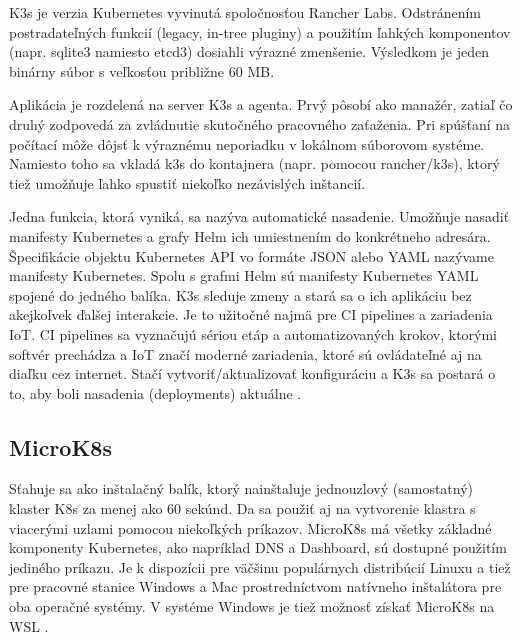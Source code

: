 K3s je verzia Kubernetes vyvinutá spoločnosťou Rancher Labs. Odstránením postradateľných funkcií (legacy, in-tree pluginy) a použitím ľahkých komponentov (napr. sqlite3 namiesto etcd3) dosiahli výrazné zmenšenie. Výsledkom je jeden binárny súbor s veľkosťou približne 60 MB.

Aplikácia je rozdelená na server K3s a agenta. Prvý pôsobí ako manažér, zatiaľ čo druhý zodpovedá za zvládnutie skutočného pracovného zaťaženia. Pri spúšťaní na počítací môže dôjsť k výraznému neporiadku v lokálnom súborovom systéme. Namiesto toho sa vkladá k3s do kontajnera (napr. pomocou rancher/k3s), ktorý tiež umožňuje ľahko spustiť niekoľko nezávislých inštancií.

Jedna funkcia, ktorá vyniká, sa nazýva automatické nasadenie. Umožňuje nasadiť manifesty Kubernetes a grafy Helm ich umiestnením do konkrétneho adresára. Špecifikácie objektu Kubernetes API vo formáte JSON alebo YAML nazývame manifesty Kubernetes. Spolu s grafmi Helm sú manifesty Kubernetes YAML spojené do jedného balíka. K3s sleduje zmeny a stará sa o ich aplikáciu bez akejkoľvek ďalšej interakcie. Je to užitočné najmä pre CI pipelines a zariadenia IoT. CI pipelines sa vyznačujú sériou etáp a automatizovaných krokov, ktorými softvér prechádza a IoT značí moderné zariadenia, ktoré sú ovládateľné aj na diaľku cez internet. Stačí vytvoriť/aktualizovať konfiguráciu a K3s sa postará o to, aby boli nasadenia (deployments) aktuálne \cite{k3s}.

\subsection*{MicroK8s}
Sťahuje sa ako inštalačný balík, ktorý nainštaluje jednouzlový (samostatný) klaster K8s za menej ako 60 sekúnd. Da sa použiť aj na vytvorenie klastra s viacerými uzlami pomocou niekoľkých príkazov. MicroK8s má všetky základné komponenty Kubernetes, ako napríklad DNS a Dashboard, sú dostupné použitím jediného príkazu. Je k dispozícii pre väčšinu populárnych distribúcií Linuxu a tiež pre pracovné stanice Windows a Mac prostredníctvom natívneho inštalátora pre oba operačné systémy. V systéme Windows je tiež možnosť získať MicroK8s na WSL \cite{comparetool}.

\subsection*{}

